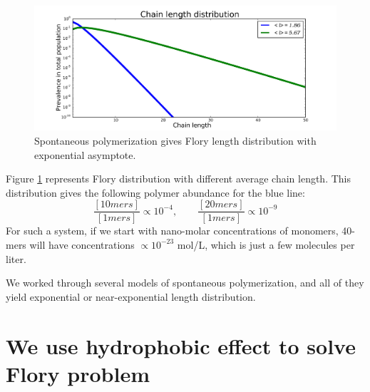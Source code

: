 \documentclass[journal=jacsat,manuscript=article,layout=twocolumn]{achemso}
\newcommand*{\pq}[1]{\left[ #1 \right]}
\begin{document}
\begin{figure}[h!]
  \centering
  \includegraphics[width=\columnwidth]{pictures/flory2.pdf} 
  \caption{Spontaneous polymerization gives Flory length distribution with exponential asymptote.}
  \label{fig:flory}
\end{figure}
Figure \ref{fig:flory} represents Flory distribution with different average chain length. 
This distribution gives the following 
polymer abundance for the blue line:
\begin{equation}
  \frac{\pq{10mers}}{\pq{1mers}}\propto10^{-4},\qquad\frac{\pq{20mers}}{\pq{1mers}}\propto10^{-9}
\end{equation} 
For such a system, if we start with nano-molar concentrations of monomers, 40-mers will have 
concentrations $\propto 10^{-23} $ mol/L, which is just a few molecules per liter. 

We worked through several models of spontaneous polymerization, and all of they yield exponential 
or near-exponential length distribution.

\section{We use hydrophobic effect to solve Flory problem}
\end{document}
